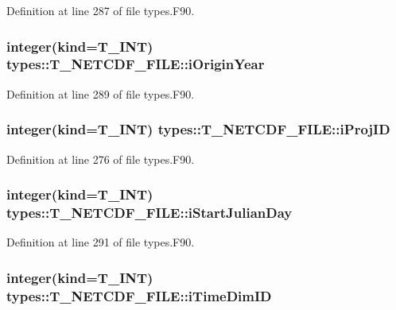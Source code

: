 Definition at line 287 of file types.F90.

\hypertarget{typetypes_1_1_t___n_e_t_c_d_f___f_i_l_e_acb7536a22ad15015c1624a98e122ddd8}{
\subsubsection[{iOriginYear}]{\setlength{\rightskip}{0pt plus 5cm}integer(kind={\bf T\_\-INT}) {\bf types::T\_\-NETCDF\_\-FILE::iOriginYear}}}
\label{typetypes_1_1_t___n_e_t_c_d_f___f_i_l_e_acb7536a22ad15015c1624a98e122ddd8}


Definition at line 289 of file types.F90.

\hypertarget{typetypes_1_1_t___n_e_t_c_d_f___f_i_l_e_ad055f4b4212efc868d7895bd8b4a4918}{
\subsubsection[{iProjID}]{\setlength{\rightskip}{0pt plus 5cm}integer(kind={\bf T\_\-INT}) {\bf types::T\_\-NETCDF\_\-FILE::iProjID}}}
\label{typetypes_1_1_t___n_e_t_c_d_f___f_i_l_e_ad055f4b4212efc868d7895bd8b4a4918}


Definition at line 276 of file types.F90.

\hypertarget{typetypes_1_1_t___n_e_t_c_d_f___f_i_l_e_a1247dc320c1d09b8f7f57336744f5834}{
\subsubsection[{iStartJulianDay}]{\setlength{\rightskip}{0pt plus 5cm}integer(kind={\bf T\_\-INT}) {\bf types::T\_\-NETCDF\_\-FILE::iStartJulianDay}}}
\label{typetypes_1_1_t___n_e_t_c_d_f___f_i_l_e_a1247dc320c1d09b8f7f57336744f5834}


Definition at line 291 of file types.F90.

\hypertarget{typetypes_1_1_t___n_e_t_c_d_f___f_i_l_e_ab864b323ba2babeb0b3689d4d8d5ccf9}{
\subsubsection[{iTimeDimID}]{\setlength{\rightskip}{0pt plus 5cm}integer(kind={\bf T\_\-INT}) {\bf types::T\_\-NETCDF\_\-FILE::iTimeDimID}}}
\label{typetypes_1_1_t___n_e_t_c_d_f___f_i_l_e_ab864b323ba2babeb0b3689d4d8d5ccf9}


